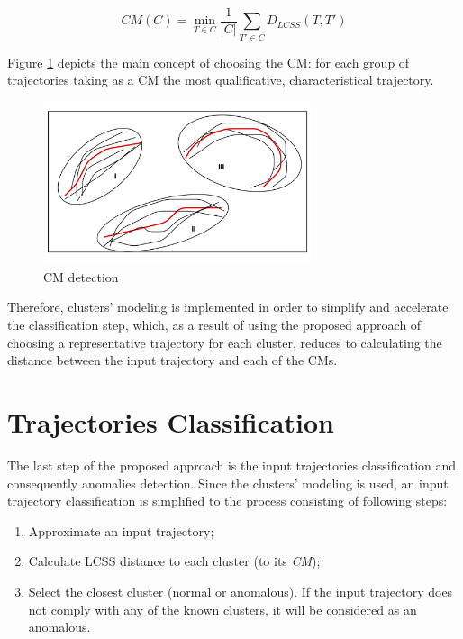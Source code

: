 \begin{equation} \label{eq:cm_traj}
	CM(C) = \min\limits_{T \in C} \frac{1}{|C|} \sum_{T' \in C} D_{LCSS}(T, T')
\end{equation}

Figure \ref{fig:cm-modeling} depicts the main concept of choosing the CM: for each group of trajectories taking as a CM the most qualificative, characteristical trajectory.

\begin{figure}[!htb]
	\centering{}
	\includegraphics[width=0.7\textwidth]{images/cm-modeling.png}
	\caption{CM detection}
	\label{fig:cm-modeling}
\end{figure}

Therefore, clusters' modeling is implemented in order to simplify and accelerate the classification step, which, as a result of using the proposed approach of choosing a representative trajectory for each cluster, reduces to calculating the distance between the input trajectory and each of the CMs.

\section{Trajectories Classification}

The last step of the proposed approach is the input trajectories classification and consequently anomalies detection. Since the clusters' modeling is used, an input trajectory classification is simplified to the process consisting of following steps:

\begin{enumerate}
	\setlength\itemsep{0em}	
	\item Approximate an input trajectory;
	\item Calculate LCSS distance to each cluster (to its \textit{CM});
	\item Select the closest cluster (normal or anomalous). If the input trajectory does not comply with any of the known clusters, it will be considered as an anomalous.
\end{enumerate}

